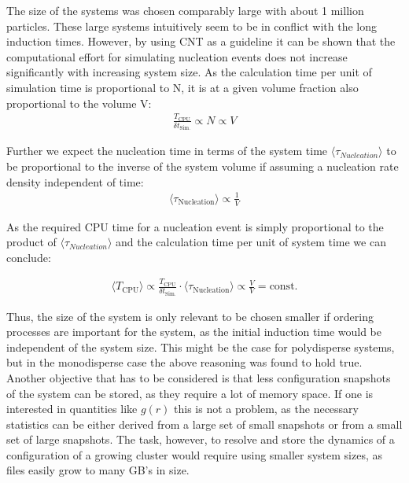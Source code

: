 The size of the systems was chosen comparably large with about 1 million particles. These large systems intuitively seem to be in conflict with the long induction times. However, by using CNT as a guideline it can be shown that the computational effort for simulating nucleation events does not increase significantly with increasing system size. As the calculation time per unit of simulation time is proportional to N, it is at a given volume fraction also proportional to the volume V:
\begin{align}
\label{eqn:system_size}
\frac{T_{\text{CPU}}}{\delta t_{\text{Sim.}}} \propto N \propto V 
\end{align}

Further we expect the nucleation time in terms of the system time $\langle \tau_{Nucleation} \rangle$ to be proportional to the inverse of the system volume if assuming a nucleation rate density independent of time:
\begin{align}
\langle \tau_{\text{Nucleation}} \rangle \propto \frac{1}{V}
\end{align}

As the required CPU time for a nucleation event is simply proportional to the product of $\langle \tau_{Nucleation} \rangle$ and the calculation time per unit of system time we can conclude:

\begin{align}
\langle T_{\text{CPU}} \rangle \propto  \frac{T_{\text{CPU}}}{\delta t_{\text{Sim.}}}  \cdot \langle \tau_{\text{Nucleation}} \rangle \propto \frac{V}{V} = \text{const.}
\end{align}

Thus, the size of the system is only relevant to be chosen smaller if ordering processes are important for the system, as the initial induction time would be independent of the system size. This might be the case for polydisperse systems, but in the monodisperse case the above reasoning was found to hold true.\\
Another objective that has to be considered is that less configuration snapshots of the system can be stored, as they require a lot of memory space. If one is interested in quantities like $g(r)$ this is not a problem, as the necessary statistics can be either derived from a large set of small snapshots or from a small set of large snapshots. The task, however, to resolve and store the dynamics of a configuration of a growing cluster would require using smaller system sizes, as files easily grow to many GB's in size. 

